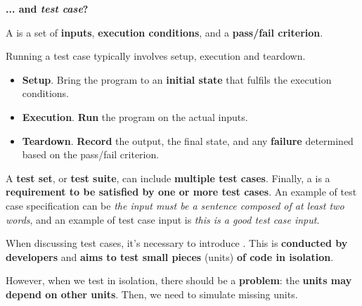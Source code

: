 \begin{flushleft}
    \textcolor{Green3}{ \textbf{... and \emph{test case}?}}
\end{flushleft}
\begin{definitionbox}
    A  is a set of \textbf{inputs}, \textbf{execution conditions}, and a \textbf{pass/fail criterion}.
\end{definitionbox}

\noindent
Running a test case typically involves setup, execution and teardown.
\begin{itemize}
    \item \textbf{Setup}. Bring the program to an \textbf{initial state} that fulfils the execution conditions.
    
    \item \textbf{Execution}. \textbf{Run} the program on the actual inputs.
    
    \item \textbf{Teardown}. \textbf{Record} the output, the final state, and any \textbf{failure} determined based on the pass/fail criterion.
\end{itemize}
A \textbf{test set}, or \textbf{test suite}, can include \textbf{multiple test cases}. Finally, a  is a \textbf{requirement to be satisfied by one or more test cases}. An example of test case specification can be \emph{the input must be a sentence composed of at least two words}, and an example of test case input is \emph{this is a good test case input}.

\highspace
When discussing test cases, it's necessary to introduce . This is \textbf{conducted by developers} and \textbf{aims to test small pieces} (units) \textbf{of code in isolation}. 

However, when we test in isolation, there should be a \textbf{problem}: the \textbf{units may depend on other units}. Then, we need to simulate missing units.

